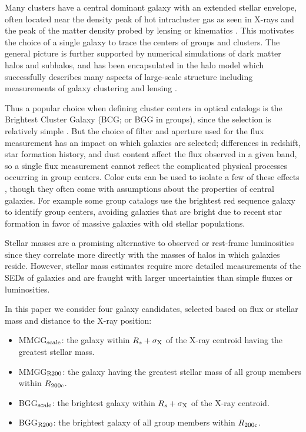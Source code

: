 Many clusters have a central dominant galaxy with an extended stellar
envelope, often located near the density peak of hot intracluster gas
as seen in X-rays and the peak of the matter density probed by lensing
or kinematics \citep[e.g.,][and references therein]{Lin2004b}. This
motivates the choice of a single galaxy to trace the centers of groups
and clusters. The general picture is further supported by numerical
simulations of dark matter halos and subhalos, and has been
encapsulated in the halo model which successfully describes many
aspects of large-scale structure including measurements of galaxy
clustering and lensing \citep[e.g.,][]{Cooray2002, Zehavi2005,
  Mandelbaum2006a, Leauthaud2012}.

Thus a popular choice when defining cluster centers in optical catalogs is
the Brightest Cluster Galaxy (BCG; or BGG in groups), since the
selection is relatively simple 
\citep[e.g.,][]{Koester2007a, Hao2010}. But the choice of filter and
aperture used for the flux measurement has an impact on which galaxies
are selected; differences in redshift, star formation history, and
dust content affect the flux observed in a given band, so a single
flux measurement cannot reflect the complicated physical processes
occurring in group centers. Color cuts can be used to isolate a few of
these effects \citep[e.g.,][]{Gladders2000}, though they often come
with assumptions about the properties of central galaxies. For example
some group catalogs use the brightest red sequence galaxy to identify
group centers, avoiding galaxies that are bright due to recent star
formation in favor of massive galaxies with old stellar
populations. 

Stellar masses are a promising alternative to observed or
rest-frame luminosities since they correlate more directly with the
masses of halos in which galaxies reside. However, stellar mass
estimates require more detailed measurements of the SEDs of galaxies
and are fraught with larger uncertainties than simple fluxes or luminosities.

In this paper we consider four galaxy candidates, selected based on
flux or stellar mass and distance to the X-ray position:

\begin{itemize}
\item MMGG$_{\rm scale}$: the galaxy within $R_{s}+\sigma_{\rm X}$ of
  the X-ray centroid having the greatest stellar mass.
\item MMGG$_{\rm R200}$: the galaxy having the greatest stellar mass
  of all group members within $R_{\rm 200c}$.
\item BGG$_{\rm scale}$: the brightest galaxy within $R_{s}+\sigma_{\rm X}$ of
  the X-ray centroid.
\item BGG$_{\rm R200}$: the brightest galaxy of all group members
  within $R_{\rm 200c}$.
\end{itemize}

